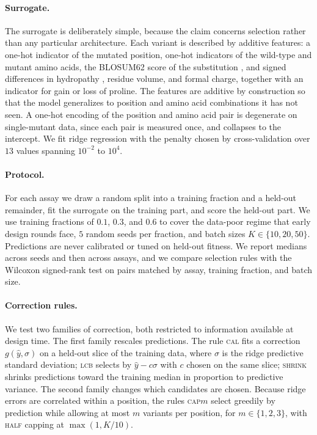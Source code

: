 \documentclass{article}
\theoremstyle{plain}
\theoremstyle{definition}
\newcommand{\yhat}{\hat{y}}
\begin{document}
\paragraph{Surrogate.}
The surrogate is deliberately simple, because the claim concerns selection rather than
any particular architecture. Each variant is described by additive features: a one-hot
indicator of the mutated position, one-hot indicators of the wild-type and mutant amino
acids, the BLOSUM62 score of the substitution \citep{henikoff1992amino}, and signed
differences in hydropathy \citep{kyte1982simple}, residue volume, and formal charge,
together with an indicator for gain or loss of proline. The features are additive by
construction so that the model generalizes to position and amino acid combinations it
has not seen. A one-hot encoding of the position and amino acid pair is degenerate on
single-mutant data, since each pair is measured once, and collapses to the intercept.
We fit ridge regression with the penalty chosen by cross-validation over $13$ values
spanning $10^{-2}$ to $10^{4}$.

\paragraph{Protocol.}
For each assay we draw a random split into a training fraction and a held-out
remainder, fit the surrogate on the training part, and score the held-out part. We use
training fractions of $0.1$, $0.3$, and $0.6$ to cover the data-poor regime that early
design rounds face, $5$ random seeds per fraction, and batch sizes $K \in \{10, 20,
50\}$. Predictions are never calibrated or tuned on held-out fitness. We report medians
across seeds and then across assays, and we compare selection rules with the Wilcoxon
signed-rank test on pairs matched by assay, training fraction, and batch size.

\paragraph{Correction rules.}
We test two families of correction, both restricted to information available at design
time. The first family rescales predictions. The rule \textsc{cal} fits a correction
$g(\yhat, \sigma)$ on a held-out slice of the training data, where $\sigma$ is the ridge
predictive standard deviation; \textsc{lcb} selects by $\yhat - c\sigma$ with $c$ chosen
on the same slice; \textsc{shrink} shrinks predictions toward the training median in
proportion to predictive variance. The second family changes which candidates are
chosen. Because ridge errors are correlated within a position, the rules
\textsc{cap}$m$ select greedily by prediction while allowing at most $m$ variants per
position, for $m \in \{1,2,3\}$, with \textsc{half} capping at $\max(1, K/10)$.
\end{document}
